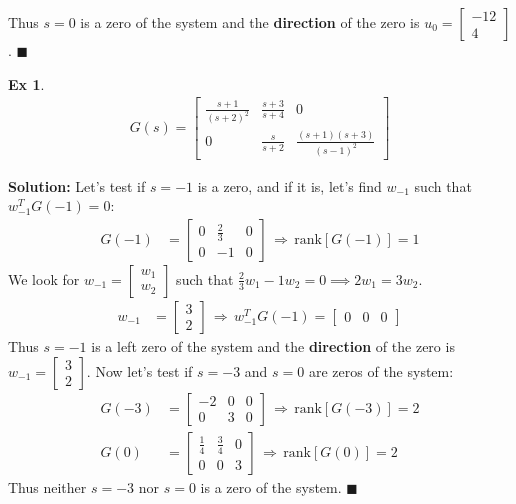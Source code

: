 \documentclass[twoside]{article}
\newtheorem{exmp}[theorem]{Ex}
\begin{document}
%
Thus $s = 0$ is a zero of the system and the \textbf{direction} of the zero is $u_0 = \begin{bmatrix} -12 \\ 4 \end{bmatrix} $. \hfill $\blacksquare$
%
\begin{exmp}
	\begin{align*}
	G(s) = \begin{bmatrix} \frac{s+1}{(s+2)^2} & \frac{s+3}{s+4} & 0 \\  
	0 & \frac{s}{s+2} & \frac{(s+1)(s+3)}{(s-1)^2}
        \end{bmatrix}
	\end{align*}
\end{exmp}
%
\textbf{Solution:} Let's test if $s = -1$ is a zero, and if it is, let's find $w_{-1}$ such that $w_{-1}^T G(-1) = 0$:
%
\begin{align*}
	G(-1) &= \begin{bmatrix} 0 & \frac{2}{3} & 0 \\  
	0 & -1 & 0
        \end{bmatrix} \, \Rightarrow \, \mathrm{rank}[G(-1)] = 1
\end{align*}
%
We look for $w_{-1} = \begin{bmatrix} w_1 \\ w_2 \end{bmatrix}$ such that $\frac{2}{3}w_1 - 1w_2 = 0 \implies 2w_1 = 3w_2$.
\begin{align*}
        w_{-1} &= \begin{bmatrix} 3 \\ 2 \end{bmatrix} \, \Rightarrow \, w_{-1}^T G(-1) = \begin{bmatrix} 0 & 0 & 0 \end{bmatrix}
\end{align*}
%
Thus $s = -1$ is a left zero of the system and the \textbf{direction} of the zero is $w_{-1} = \begin{bmatrix} 3 \\ 2 \end{bmatrix} $.
Now let's test if $s = -3$ and $s=0$ are zeros of the system:
%
\begin{align*}
	G(-3) &= \begin{bmatrix} -2 & 0 & 0 \\  
	0 & 3 & 0
        \end{bmatrix} \, \Rightarrow \, \mathrm{rank}[G(-3)] = 2
        \\
        G(0) &= \begin{bmatrix} \frac{1}{4} & \frac{3}{4} & 0 \\  
	0 & 0 & 3
        \end{bmatrix} \, \Rightarrow \, \mathrm{rank}[G(0)] = 2
\end{align*}
%
Thus neither $s=-3$ nor $s=0$ is a zero of the system. \hfill $\blacksquare$
\end{document}
